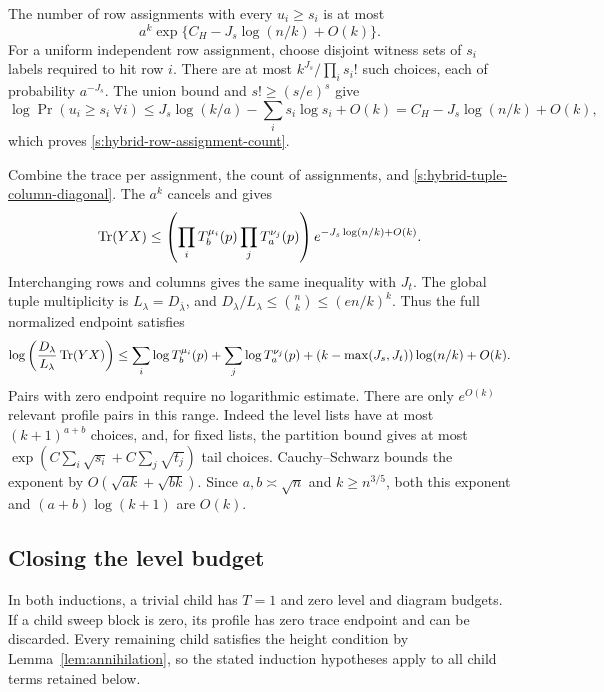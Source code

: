 The number of row assignments with every $u_i\ge s_i$ is at most
\begin{equation}\label{s:hybrid-row-assignment-count}
 a^k\exp\{C_H-J_s\log(n/k)+O(k)\}.
\end{equation}
For a uniform independent row assignment, choose disjoint witness
sets of $s_i$ labels required to hit row $i$. There are at most
$k^{J_s}/\prod_i s_i!$ such choices, each of probability
$a^{-J_s}$. The union bound and $s!\ge(s/e)^s$ give
\[
 \log\Pr(u_i\ge s_i\ \forall i)
 \le J_s\log(k/a)-\sum_i s_i\log s_i+O(k)
 = C_H-J_s\log(n/k)+O(k),
\]
which proves \eqref{s:hybrid-row-assignment-count}.

Combine the trace per assignment, the count of assignments, and
\eqref{s:hybrid-tuple-column-diagonal}. The $a^k$ cancels and gives
\[
 \operatorname{Tr}(YX)\le
 \left(\prod_iT_b^{\mu_i}(p)\prod_jT_a^{\nu_j}(p)\right)
       e^{-J_s\log(n/k)+O(k)}.
\]
Interchanging rows and columns gives the same inequality with $J_t$.
The global tuple multiplicity is $L_\lambda=D_{\bar\lambda}$,
and $D_\lambda/L_\lambda\le\binom nk\le(en/k)^k$.
Thus the full normalized endpoint satisfies
\begin{equation}\label{rec:hybrid-tuple-trace}
 \log\left(\frac{D_\lambda}{L_\lambda}
                      \operatorname{Tr}(YX)\right)
 \le\sum_i\log T_b^{\mu_i}(p)+\sum_j\log T_a^{\nu_j}(p)
       +(k-\max(J_s,J_t))\log(n/k)+O(k).
\end{equation}
Pairs with zero endpoint require no logarithmic estimate.
There are only $e^{O(k)}$ relevant profile pairs in this range.
Indeed the level lists have at most $(k+1)^{a+b}$ choices, and,
for fixed lists, the partition bound gives at most
$\exp(C\sum_i\sqrt{s_i}+C\sum_j\sqrt{t_j})$
tail choices. Cauchy--Schwarz bounds the exponent by
$O(\sqrt{ak}+\sqrt{bk})$. Since $a,b\asymp\sqrt n$ and
$k\ge n^{3/5}$, both this exponent and $(a+b)\log(k+1)$ are $O(k)$.

\subsection{Closing the level budget}

In both inductions, a trivial child has $T=1$ and zero level and
diagram budgets. If a child sweep block is zero, its profile has zero
trace endpoint and can be discarded. Every remaining child satisfies
the height condition by Lemma~\ref{lem:annihilation}, so the stated
induction hypotheses apply to all child terms retained below.

